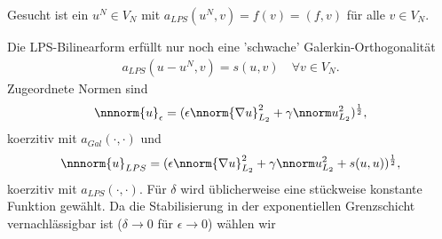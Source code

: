 Gesucht ist ein $u^{N} \in V_{N}$ mit $a_{LPS}(u^{N}, v) = f(v) = (f, v)$ für alle $v \in V_{N}$. 

Die LPS-Bilinearform erfüllt nur noch eine 'schwache' Galerkin-Orthogonalität
\begin{align*}
  a_{LPS}(u - u^{N}, v) = s(u, v) \quad \forall v \in V_{N}. 
\end{align*}
Zugeordnete Normen sind
\begin{align*}
  \nnnorm{u}_{\epsilon} = (\epsilon \nnorm{\nabla u}_{L_{2}}^{2} + \gamma \nnorm u_{L_{2}}^{2})^{\frac 12}, 
\end{align*}
koerzitiv mit $a_{Gal}(\cdot, \cdot)$ und 
\begin{align*}
    \nnnorm{u}_{LPS} = (\epsilon \nnorm{\nabla u}_{L_{2}}^{2} + \gamma \nnorm u_{L_{2}}^{2} + s(u, u))^{\frac 12}, 
\end{align*}
koerzitiv mit $a_{LPS}(\cdot, \cdot)$.
Für $\delta$ wird üblicherweise eine stückweise konstante Funktion gewählt. 
Da die Stabilisierung in der exponentiellen Grenzschicht vernachlässigbar ist ($\delta \to 0$ für $\epsilon \to 0$) wählen wir

